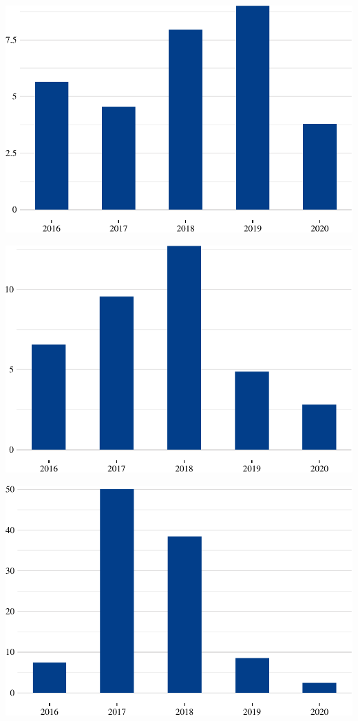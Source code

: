 \includegraphics{fig/lentes1-1.pdf}

\includegraphics{fig/outros1-1.pdf}

\includegraphics{fig/oleo-1.pdf}

